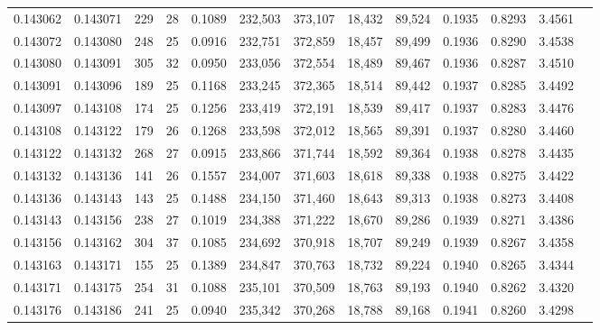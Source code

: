 \begin{tabular}{rrrrrrrrrrrrr}
0.143062 & 0.143071 & 229 &  28 &                                     0.1089 & 232,503 & 373,107 &  18,432 &  89,524 & 0.1935 & 0.8293 & 3.4561 \\
0.143072 & 0.143080 & 248 &  25 &                                     0.0916 & 232,751 & 372,859 &  18,457 &  89,499 & 0.1936 & 0.8290 & 3.4538 \\
0.143080 & 0.143091 & 305 &  32 &                                     0.0950 & 233,056 & 372,554 &  18,489 &  89,467 & 0.1936 & 0.8287 & 3.4510 \\
0.143091 & 0.143096 & 189 &  25 &                                     0.1168 & 233,245 & 372,365 &  18,514 &  89,442 & 0.1937 & 0.8285 & 3.4492 \\
0.143097 & 0.143108 & 174 &  25 &                                     0.1256 & 233,419 & 372,191 &  18,539 &  89,417 & 0.1937 & 0.8283 & 3.4476 \\
0.143108 & 0.143122 & 179 &  26 &                                     0.1268 & 233,598 & 372,012 &  18,565 &  89,391 & 0.1937 & 0.8280 & 3.4460 \\
0.143122 & 0.143132 & 268 &  27 &                                     0.0915 & 233,866 & 371,744 &  18,592 &  89,364 & 0.1938 & 0.8278 & 3.4435 \\
0.143132 & 0.143136 & 141 &  26 &                                     0.1557 & 234,007 & 371,603 &  18,618 &  89,338 & 0.1938 & 0.8275 & 3.4422 \\
0.143136 & 0.143143 & 143 &  25 &                                     0.1488 & 234,150 & 371,460 &  18,643 &  89,313 & 0.1938 & 0.8273 & 3.4408 \\
0.143143 & 0.143156 & 238 &  27 &                                     0.1019 & 234,388 & 371,222 &  18,670 &  89,286 & 0.1939 & 0.8271 & 3.4386 \\
0.143156 & 0.143162 & 304 &  37 &                                     0.1085 & 234,692 & 370,918 &  18,707 &  89,249 & 0.1939 & 0.8267 & 3.4358 \\
0.143163 & 0.143171 & 155 &  25 &                                     0.1389 & 234,847 & 370,763 &  18,732 &  89,224 & 0.1940 & 0.8265 & 3.4344 \\
0.143171 & 0.143175 & 254 &  31 &                                     0.1088 & 235,101 & 370,509 &  18,763 &  89,193 & 0.1940 & 0.8262 & 3.4320 \\
0.143176 & 0.143186 & 241 &  25 &                                     0.0940 & 235,342 & 370,268 &  18,788 &  89,168 & 0.1941 & 0.8260 & 3.4298 \\

\end{tabular}
